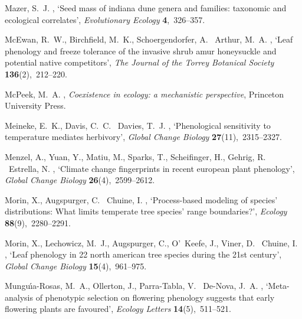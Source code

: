 \documentclass[11pt]{article}
\begin{document}
\begin{thebibliography}{xx}
Mazer, S.~J.  \harvardyearright , `Seed mass of indiana
  dune genera and families: taxonomic and ecological correlates', {\em
  Evolutionary Ecology} {\bf 4},~326--357.

McEwan, R.~W., Birchfield, M.~K., Schoergendorfer, A. \harvardand\ Arthur,
  M.~A.  \harvardyearleft 2009\harvardyearright , `Leaf phenology and freeze
  tolerance of the invasive shrub amur honeysuckle and potential native
  competitors', {\em The Journal of the Torrey Botanical Society} {\bf
  136}(2),~212--220.

McPeek, M.~A.  \harvardyearright , {\em Coexistence in
  ecology: a mechanistic perspective}, Princeton University Press.

Meineke, E.~K., Davis, C.~C. \harvardand\ Davies, T.~J.  \harvardyearleft
  2021\harvardyearright , `Phenological sensitivity to temperature mediates
  herbivory', {\em Global Change Biology} {\bf 27}(11),~2315--2327.

Menzel, A., Yuan, Y., Matiu, M., Sparks, T., Scheifinger, H., Gehrig, R.
  \harvardand\ Estrella, N.  \harvardyearleft 2020\harvardyearright , `Climate
  change fingerprints in recent european plant phenology', {\em Global Change
  Biology} {\bf 26}(4),~2599--2612.

Morin, X., Augspurger, C. \harvardand\ Chuine, I.  \harvardyearleft
  2007\harvardyearright , `Process-based modeling of species' distributions:
  What limits temperate tree species' range boundaries?', {\em Ecology} {\bf
  88}(9),~2280--2291.

Morin, X., Lechowicz, M.~J., Augspurger, C., O'~Keefe, J., Viner, D.
  \harvardand\ Chuine, I.  \harvardyearleft 2009\harvardyearright , `Leaf
  phenology in 22 north american tree species during the 21st century', {\em
  Global Change Biology} {\bf 15}(4),~961--975.

Mungu{\'\i}a-Rosas, M.~A., Ollerton, J., Parra-Tabla, V. \harvardand\ De-Nova,
  J.~A.  \harvardyearleft 2011\harvardyearright , `Meta-analysis of phenotypic
  selection on flowering phenology suggests that early flowering plants are
  favoured', {\em Ecology Letters} {\bf 14}(5),~511--521.


\end{thebibliography}
\end{document}
